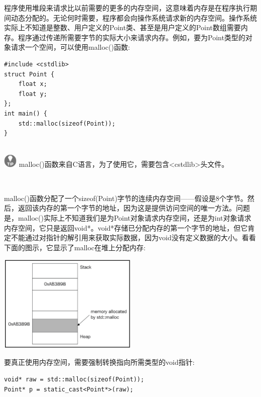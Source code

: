 程序使用堆段来请求比以前需要的更多的内存空间，这意味着内存是在程序执行期间动态分配的。无论何时需要，程序都会向操作系统请求新的内存空间。操作系统实际上不知道是整数、用户定义的Point类、甚至是用户定义的Point数组需要内存。程序通过传递所需要字节的实际大小来请求内存。例如，要为Point类型的对象请求一个空间，可以使用malloc()函数: \par

\begin{lstlisting}[caption={}]
#include <cstdlib>
struct Point {
	float x;
	float y;
};
int main() {
	std::malloc(sizeof(Point));
}
\end{lstlisting}

\hspace*{\fill} \\ %
\includegraphics[width=0.05\textwidth]{images/tip}
malloc()函数来自C语言，为了使用它，需要包含<cstdlib>头文件。\par
\noindent\textbf{}\ \par

malloc()函数分配了一个sizeof(Point)字节的连续内存空间——假设是8个字节。然后，返回该内存的第一个字节的地址，因为这是提供访问空间的唯一方法。问题是，malloc()实际上不知道我们是为Point对象请求内存空间，还是为int对象请求内存空间，它只是返回void*。void*存储已分配内存的第一个字节的地址，但它肯定不能通过对指针的解引用来获取实际数据，因为void没有定义数据的大小。看看下面的图示，它显示了malloc在堆上分配内存:\par

\begin{center}
	\includegraphics[width=0.5\textwidth]{content/Section-1/Chapter-2/13}
\end{center}

要真正使用内存空间，需要强制转换指向所需类型的void指针:\par

\begin{lstlisting}[caption={}]
void* raw = std::malloc(sizeof(Point));
Point* p = static_cast<Point*>(raw);
\end{lstlisting}

